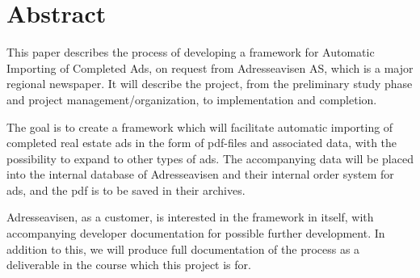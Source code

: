 \chapter*{Abstract}

This paper describes the process of developing a framework for Automatic Importing of Completed Ads, on request from Adresseavisen AS, which is a major regional newspaper. It will describe the project, from the preliminary study phase and project management/organization, to implementation and completion.

The goal is to create a framework which will facilitate automatic importing of completed real estate ads in the form of pdf-files and associated data, with the possibility to expand to other types of ads. The accompanying data will be placed into the internal database of Adresseavisen and their internal order system for ads, and the pdf is to be saved in their archives.

Adresseavisen, as a customer, is interested in the framework in itself, with accompanying developer documentation for possible further development. In addition to this, we will produce full documentation of the process as a deliverable in the course which this project is for.
